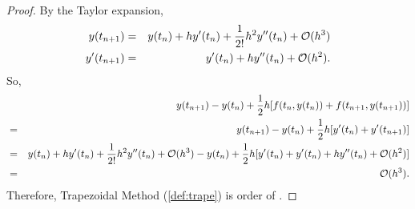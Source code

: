\documentclass[12pt]  {article}%
\begin{document}
\begin{proof}
By the Taylor expansion,
 \begin{eqnarray}\label{eqn:trapetay}
 y(t_{n+1})&=&y(t_n)+hy'(t_n)+\frac{1}{2!}h^2y''(t_n)+\mathcal{O}{(h^3)}\\
 y'(t_{n+1})&=&y'(t_n)+hy''(t_n)+\mathcal{O}(h^2).
\end{eqnarray}
So,
 \begin{eqnarray}\label{eqn:trapediff1}
&&y(t_{n+1})-y(t_n)+\frac{1}{2}h [f(t_n,y(t_n))+f(t_{n+1},y(t_{n+1}))]\nonumber\\
&=&y(t_{n+1})-y(t_n)+\frac{1}{2}h [y'(t_n)+y'(t_{n+1})]\nonumber\\
 &=&y(t_n)+hy'(t_n)+\frac{1}{2!}h^2y''(t_n)+\mathcal{O}{(h^3)}-y(t_n)+\frac{1}{2}h [y'(t_n)+y'(t_n)+hy''(t_n)+\mathcal{O}(h^2)]\\
 &=&\mathcal{O}{(h^3)}\nonumber.
\end{eqnarray}
Therefore, Trapezoidal Method (\ref{def:trape}) is order of .
\end{proof}
\end{document}
